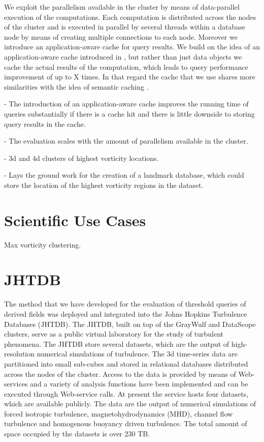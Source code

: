 \documentclass{sig-alternate}
\begin{document}
We exploit the parallelism 
available in the cluster by means of data-parallel execution of the computations. Each computation is distributed across the nodes of the cluster and
is executed in parallel by several threads within a database node by means of creating multiple connections to each node. Moreover we introduce an 
application-aware cache for query results. We build on the idea of an application-aware cache introduced in \cite{Lopez}, but rather than just data 
objects we cache the actual results of the computation, which leads to query performance improvement of up to X times. In that regard the cache
that we use shares more similarities with the idea of semantic caching \cite{Ren}.

- The introduction of an application-aware cache improves the running time of queries substantially if there is a cache hit and there is 
little downside to storing query results in the cache.

- The evaluation scales with the amount of parallelism available in the cluster. 

- 3d and 4d clusters of highest vorticity locations. 

- Lays the ground work for the creation of a landmark database, which could store the location of the highest vorticity regions in the dataset.


\section{Scientific Use Cases}\label{science_use_cases}
Max vorticity clustering.

\section{JHTDB}
The method that we have developed for the evaluation of threshold queries of derived fields was deployed and integrated into the 
Johns Hopkins Turbulence Databases (JHTDB). The JHTDB, built on top of the GrayWulf and DataScope clusters, serve as a public virtual laboratory for
the study of turbulent phenomena. The JHTDB store several datasets, which are the output of high-resolution numerical simulations of turbulence.
The 3d time-series data are partitioned into small sub-cubes and stored in relational databases distributed across the nodes of the cluster.
Access to the data is provided by means of Web-services and a variety of analysis functions have been
implemented and can be executed through Web-service calls.
At present the service hosts four datasets, which are available publicly. 
The data are the output of numerical simulations of forced isotropic turbulence, magnetohydrodynamics (MHD), channel 
flow turbulence and homogenous buoyancy driven turbulence.
The total amount of space occupied by the datasets is over 230 TB. 
\end{document}
